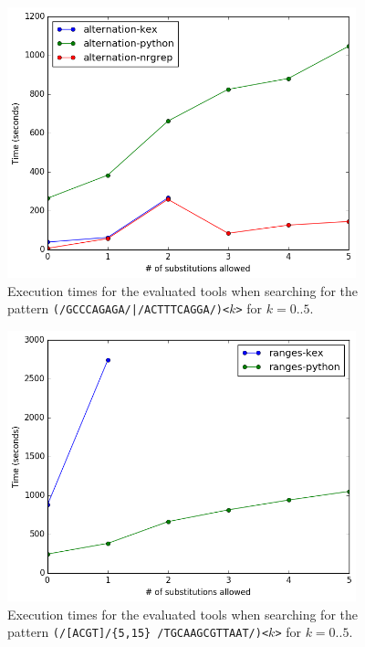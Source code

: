 \begin{figure}[!ht]
  \centering
  \includegraphics[width=0.9\textwidth]{images/alternation.png}
  \caption{Execution times for the evaluated tools when searching for the
    pattern \texttt{(/GCCCAGAGA/|/ACTTTCAGGA/)<$k$>} for $k=0..5$.}
  \label{fig:alternation}
\end{figure}

\begin{figure}[!ht]
  \centering
  \includegraphics[width=0.9\textwidth]{images/ranges.png}
  \caption{Execution times for the evaluated tools when searching for the
    pattern \texttt{(/[ACGT]/\{5,15\} /TGCAAGCGTTAAT/)<$k$>} for $k=0..5$.}
  \label{fig:ranges}
\end{figure}

